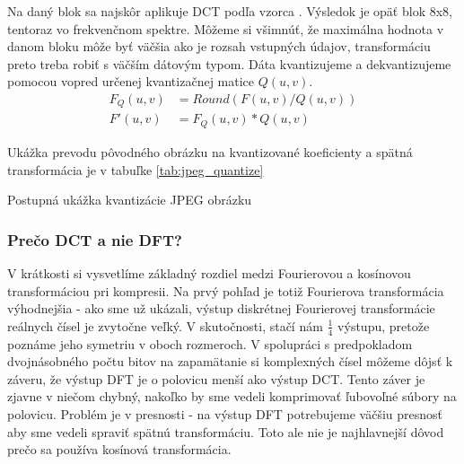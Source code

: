 Na daný blok sa najskôr aplikuje DCT podľa vzorca \todo{}. Výsledok je opäť blok 8x8,
tentoraz vo frekvenčnom spektre. Môžeme si všimnúť, že maximálna
hodnota v danom bloku môže byť väčšia ako je rozsah vstupných údajov,
transformáciu preto treba robiť s väčším dátovým typom.
Dáta kvantizujeme a dekvantizujeme pomocou vopred určenej kvantizačnej matice $Q(u,v)$.
\begin{align}
    F_Q(u,v) &= Round (F(u,v)/Q(u,v)) \\
    F'(u,v) &= F_Q(u,v) * Q(u,v)
\end{align}

Ukážka prevodu pôvodného obrázku na kvantizované koeficienty a
spätná transformácia je v tabuľke \ref{tab:jpeg_quantize}

\begin{table}[htb]
    \centering

    \subtable[DCT]{
    \tiny
    
    }

    \subtable[Po kvantizácii]{
    \tiny
    
    }
    
    \subtable[Dekvantizácia]{
    \tiny
    
    }
    
    
    \caption{Postupná ukážka kvantizácie JPEG obrázku}
    \label{tab:jpeg_quantize}
\end{table}

\subsubsection{Prečo DCT a nie DFT?}
 V krátkosti si vysvetlíme základný rozdiel medzi Fourierovou a
 kosínovou transformáciou pri kompresii. Na prvý pohľad je totiž
 Fourierova transformácia výhodnejšia - ako sme už ukázali, výstup
 diskrétnej Fourierovej transformácie reálnych čísel je zvytočne
 veľký. V skutočnosti, stačí nám $\frac{1}{4}$ výstupu, pretože
 poznáme jeho symetriu v oboch rozmeroch. V spolupráci s predpokladom
 dvojnásobného počtu bitov na zapamätanie si komplexných čísel môžeme
 dôjsť k záveru, že výstup DFT je o polovicu menší ako výstup DCT.
 Tento záver je zjavne v niečom chybný, nakoľko by sme vedeli
 komprimovať ľubovoľné súbory na polovicu. Problém je v  presnosti -
 na výstup DFT potrebujeme väčšiu presnosť aby sme vedeli spraviť
 spätnú transformáciu. Toto ale nie je najhlavnejší dôvod prečo sa
 používa kosínová transformácia.

